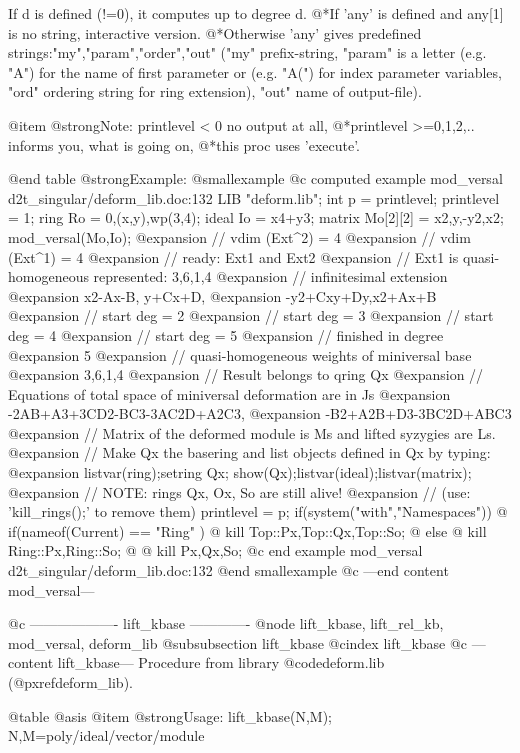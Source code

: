 If d is defined (!=0), it computes up to degree d.
@*If 'any' is defined and any[1] is no string, interactive version.
@*Otherwise 'any' gives predefined strings:"my","param","order","out"
("my" prefix-string, "param" is a letter (e.g. "A") for the name of
first parameter or (e.g. "A(") for index parameter variables, "ord"
ordering string for ring extension), "out" name of output-file).

@item @strong{Note:}
printlevel < 0 no output at all,
@*printlevel >=0,1,2,.. informs you, what is going on,
@*this proc uses 'execute'.

@end table
@strong{Example:}
@smallexample
@c computed example mod_versal d2t_singular/deform_lib.doc:132 
LIB "deform.lib";
int p = printlevel;
printlevel = 1;
ring  Ro = 0,(x,y),wp(3,4);
ideal Io = x4+y3;
matrix Mo[2][2] = x2,y,-y2,x2;
mod_versal(Mo,Io);
@expansion{} // vdim (Ext^2) = 4
@expansion{} // vdim (Ext^1) = 4
@expansion{} // ready: Ext1 and Ext2
@expansion{} // Ext1 is quasi-homogeneous represented: 3,6,1,4
@expansion{} // infinitesimal extension
@expansion{} x2-Ax-B,   y+Cx+D,
@expansion{} -y2+Cxy+Dy,x2+Ax+B
@expansion{} // start deg = 2
@expansion{} // start deg = 3
@expansion{} // start deg = 4
@expansion{} // start deg = 5
@expansion{} // finished in degree 
@expansion{} 5
@expansion{} // quasi-homogeneous weights of miniversal base
@expansion{} 3,6,1,4
@expansion{} // Result belongs to qring Qx
@expansion{} // Equations of total space of miniversal deformation are in Js
@expansion{} -2AB+A3+3CD2-BC3-3AC2D+A2C3,
@expansion{} -B2+A2B+D3-3BC2D+ABC3
@expansion{} // Matrix of the deformed module is Ms and lifted syzygies are Ls.
@expansion{} // Make Qx the basering and list objects defined in Qx by typing:
@expansion{}    listvar(ring);setring Qx; show(Qx);listvar(ideal);listvar(matrix);
@expansion{} // NOTE: rings Qx, Ox, So are still alive!
@expansion{} // (use: 'kill_rings();' to remove them)
printlevel = p;
if(system("with","Namespaces")) @{
if(nameof(Current) == "Ring" ) @{
kill Top::Px,Top::Qx,Top::So;
@} else @{
kill Ring::Px,Ring::So;
@}
@}
kill Px,Qx,So;
@c end example mod_versal d2t_singular/deform_lib.doc:132
@end smallexample
@c ---end content mod_versal---

@c ------------------- lift_kbase -------------
@node lift_kbase, lift_rel_kb, mod_versal, deform_lib
@subsubsection lift_kbase
@cindex lift_kbase
@c ---content lift_kbase---
Procedure from library @code{deform.lib} (@pxref{deform_lib}).

@table @asis
@item @strong{Usage:}
lift_kbase(N,M); N,M=poly/ideal/vector/module

